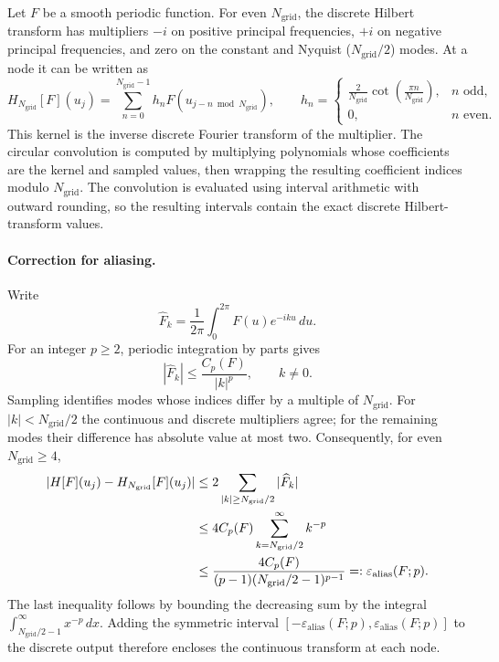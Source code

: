 \documentclass[11pt]{article}
\numberwithin{equation}{section}
\newcommand{\Ngrid}{N_{\mathrm{grid}}}
\newcommand{\epsa}{\varepsilon_{\mathrm{alias}}}
\begin{document}
Let $F$ be a smooth periodic function. For even $\Ngrid$, the discrete
Hilbert transform has multipliers $-i$ on positive principal frequencies,
$+i$ on negative principal frequencies, and zero on the constant and
Nyquist ($\Ngrid/2$) modes. At a node it can be written as
\begin{equation}
 H_{\Ngrid}[F](u_j)=\sum_{n=0}^{\Ngrid-1}h_n
 F(u_{j-n\bmod\Ngrid}),\qquad
 h_n=\begin{cases}
 \displaystyle\frac{2}{\Ngrid}\cot\!\left(\frac{\pi n}{\Ngrid}\right),
       &n\text{ odd},\\[1ex]
 0,&n\text{ even}.
 \end{cases}
 \label{eq:discrete-H}
\end{equation}
This kernel is the inverse discrete Fourier transform of the multiplier.
The circular convolution is computed by multiplying polynomials whose
coefficients are the kernel and sampled values, then wrapping the resulting
coefficient indices modulo $\Ngrid$.
The convolution is evaluated using interval arithmetic with outward
rounding, so the resulting intervals contain the exact discrete
Hilbert-transform values.

\paragraph{Correction for aliasing.}
Write
\begin{equation}
 \widehat F_k=\frac{1}{2\pi}\int_0^{2\pi}F(u)e^{-iku}\,du.
\end{equation}
For an integer $p\geq2$, periodic integration by parts gives
\begin{equation}
 |\widehat F_k|\leq\frac{C_p(F)}{|k|^p},\qquad k\ne0.
 \label{eq:decay}
\end{equation}
Sampling identifies modes whose indices differ by a multiple of $\Ngrid$.
For $|k|<\Ngrid/2$ the continuous and discrete multipliers agree; for the
remaining modes their difference has absolute value at most two.
Consequently, for even $\Ngrid\geq4$,
\begin{align}
 |H[F](u_j)-H_{\Ngrid}[F](u_j)|
 &\leq2\sum_{|k|\geq\Ngrid/2}|\widehat F_k|\notag\\
 &\leq4C_p(F)\sum_{k=\Ngrid/2}^{\infty}k^{-p}\notag\\
 &\leq\frac{4C_p(F)}{(p-1)(\Ngrid/2-1)^{p-1}}
 =:\epsa(F;p).
 \label{eq:alias}
\end{align}
The last inequality follows by bounding the decreasing sum by the integral
$\int_{\Ngrid/2-1}^{\infty}x^{-p}\,dx$. Adding the symmetric interval
$[-\epsa(F;p),\epsa(F;p)]$ to the discrete output therefore encloses the
continuous transform at each node.
\end{document}
